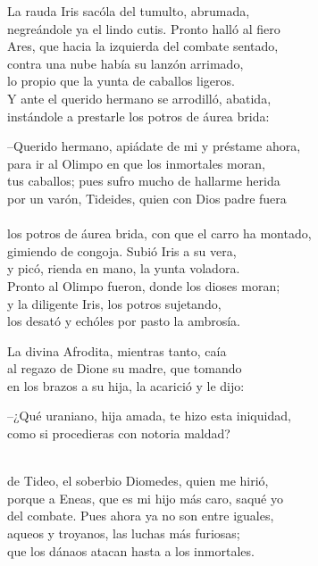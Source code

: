 La rauda Iris sacóla del tumulto, abrumada,\\
negreándole ya el lindo cutis. Pronto halló al fiero\\
Ares, que hacia la izquierda del combate sentado,\\
contra una nube había su lanzón arrimado,\\
lo propio que la yunta de caballos ligeros.\\
Y ante el querido hermano se arrodilló, abatida,\\
instándole a prestarle los potros de áurea brida:\par
--Querido hermano, apiádate de mi y préstame ahora,\\
para ir al Olimpo en que los inmortales moran,\\
tus caballos; pues sufro mucho de hallarme herida\\
por un varón, Tideides, quien con Dios padre fuera\\
\\
los potros de áurea brida, con que el carro ha montado,\\
gimiendo de congoja. Subió Iris a su vera,\\
y picó, rienda en mano, la yunta voladora.\\
Pronto al Olimpo fueron, donde los dioses moran;\\
y la diligente Iris, los potros sujetando,\\
los desató y echóles por pasto la ambrosía.\par
La divina Afrodita, mientras tanto, caía\\
al regazo de Dione su madre, que tomando\\
en los brazos a su hija, la acarició y le dijo:\par
--¿Qué uraniano, hija amada, te hizo esta iniquidad,\\
como si procedieras con notoria maldad?\par
{}\\
de Tideo, el soberbio Diomedes, quien me hirió,\\
porque a Eneas, que es mi hijo más caro, saqué yo\\
del combate. Pues ahora ya no son entre iguales,\\
aqueos y troyanos, las luchas más furiosas;\\
que los dánaos atacan hasta a los inmortales.\par
